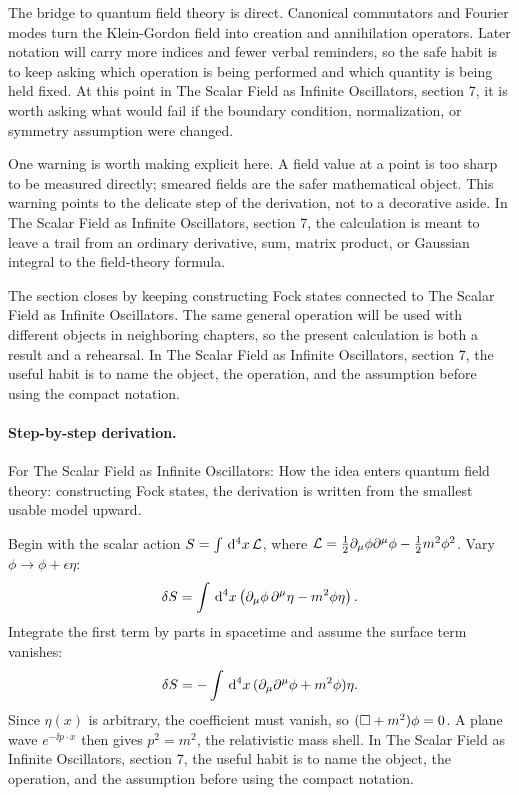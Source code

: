 The bridge to quantum field theory is direct.  Canonical commutators and Fourier modes turn the Klein-Gordon field into creation and annihilation operators.  Later notation will carry more indices and fewer verbal reminders, so the safe habit is to keep asking which operation is being performed and which quantity is being held fixed.  At this point in The Scalar Field as Infinite Oscillators, section 7, it is worth asking what would fail if the boundary condition, normalization, or symmetry assumption were changed.

One warning is worth making explicit here.  A field value at a point is too sharp to be measured directly; smeared fields are the safer mathematical object.  This warning points to the delicate step of the derivation, not to a decorative aside.  In The Scalar Field as Infinite Oscillators, section 7, the calculation is meant to leave a trail from an ordinary derivative, sum, matrix product, or Gaussian integral to the field-theory formula.

The section closes by keeping constructing Fock states connected to The Scalar Field as Infinite Oscillators.  The same general operation will be used with different objects in neighboring chapters, so the present calculation is both a result and a rehearsal.  In The Scalar Field as Infinite Oscillators, section 7, the useful habit is to name the object, the operation, and the assumption before using the compact notation.



\paragraph{Step-by-step derivation.}

For The Scalar Field as Infinite Oscillators: How the idea enters quantum field theory: constructing Fock states, the derivation is written from the smallest usable model upward.

Begin with the scalar action \(S=\int\,\mathrm d^4x\,\mathcal L\), where \(\mathcal L=\frac12\partial_\mu\phi\partial^\mu\phi-\frac12m^2\phi^2\).  Vary \(\phi\to\phi+\epsilon\eta\):
\[
  \delta S=\int\,\mathrm d^4x\left(\partial_\mu\phi\,\partial^\mu\eta-m^2\phi\eta\right).
\]
Integrate the first term by parts in spacetime and assume the surface term vanishes:
\[
  \delta S=-\int\,\mathrm d^4x\,(\partial_\mu\partial^\mu\phi+m^2\phi)\eta.
\]
Since \(\eta(x)\) is arbitrary, the coefficient must vanish, so \((\Box+m^2)\phi=0\).  A plane wave \(e^{-\ii p\cdot x}\) then gives \(p^2=m^2\), the relativistic mass shell.  In The Scalar Field as Infinite Oscillators, section 7, the useful habit is to name the object, the operation, and the assumption before using the compact notation.


